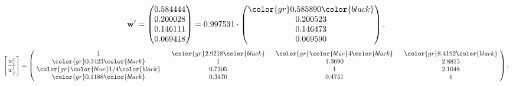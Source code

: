 \begin{example}
\begin{equation*}
\mathbf{w}^{\prime} =
\begin{pmatrix}
0.584444\\
0.200028\\
0.146111\\
0.069418
\end{pmatrix} =
0.997531\cdot
\begin{pmatrix}
\color{gr} 0.585890\color{black} \\
0.200523\\
0.146473\\
0.069590
\end{pmatrix},
\end{equation*}
\begin{equation*}
\left[ \frac{{w}^{\prime}_i}{{w}^{\prime}_j} \right] =
\begin{pmatrix}
$\,\,$ 1 $\,\,$ & $\,\,$\color{gr} 2.9218\color{black} $\,\,$ & $\,\,$\color{gr} \color{blue} 4\color{black} $\,\,$ & $\,\,$\color{gr} 8.4192\color{black} $\,\,$ \\
$\,\,$\color{gr} 0.3423\color{black} $\,\,$ & $\,\,$ 1 $\,\,$ & $\,\,$1.3690$\,\,$ & $\,\,$2.8815  $\,\,$ \\
$\,\,$\color{gr} \color{blue}  1/4\color{black} $\,\,$ & $\,\,$0.7305$\,\,$ & $\,\,$ 1 $\,\,$ & $\,\,$2.1048 $\,\,$ \\
$\,\,$\color{gr} 0.1188\color{black} $\,\,$ & $\,\,$0.3470$\,\,$ & $\,\,$0.4751$\,\,$ & $\,\,$ 1  $\,\,$ \\
\end{pmatrix},
\end{equation*}
\end{example}
\newpage
